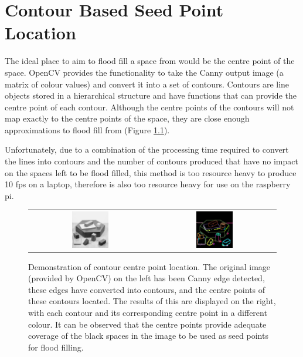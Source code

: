 \chapter{Contour Based Seed Point Location}

The ideal place to aim to flood fill a space from would be the centre point of the space. OpenCV provides the functionality to take the Canny output image (a matrix of colour values) and convert it into a set of contours. Contours are line objects stored in a hierarchical structure and have functions that can provide the centre point of each contour. Although the centre points of the contours will not map exactly to the centre points of the space, they are close enough approximations to flood fill from (Figure \ref{fig:ContourCentres}).

Unfortunately, due to a combination of the processing time required to convert the lines into contours and the number of contours produced that have no impact on the spaces left to be flood filled, this method is too resource heavy to produce 10 fps on a laptop, therefore is also too resource heavy for use on the raspberry pi.

\begin{figure}[H]
    \begin{center}
    \begin{tabular}{ c c }
        \includegraphics[width=0.31\textwidth]{Figures/blox.jpg} &
        \includegraphics[width=0.31\textwidth]{Figures/ContourCentres.jpg}
    \end{tabular}
    \caption[Demonstration of contour centre point location]{Demonstration of contour centre point location. The original image (provided by OpenCV) on the left has been Canny edge detected, these edges have converted into contours, and the centre points of these contours located. The results of this are displayed on the right, with each contour and its corresponding centre point in a different colour. It can be observed that the centre points provide adequate coverage of the black spaces in the image to be used as seed points for flood filling.}
    \label{fig:ContourCentres}
    \end{center}
\end{figure}
